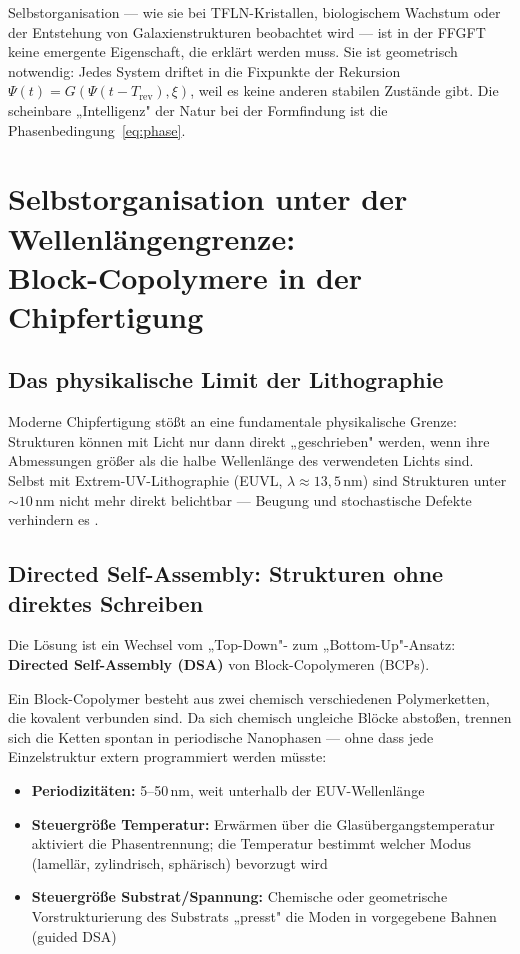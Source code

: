 Selbstorganisation — wie sie bei TFLN-Kristallen, biologischem Wachstum
oder der Entstehung von Galaxienstrukturen beobachtet wird — ist in der
FFGFT keine emergente Eigenschaft, die erklärt werden muss. Sie ist
geometrisch notwendig: Jedes System driftet in die Fixpunkte der
Rekursion $\Psi(t) = G(\Psi(t-T_\text{rev}), \xi)$, weil es keine
anderen stabilen Zustände gibt. Die scheinbare „Intelligenz" der Natur
bei der Formfindung ist die Phasenbedingung~\eqref{eq:phase}.

\section{Selbstorganisation unter der Wellenlängengrenze: \\
         Block-Copolymere in der Chipfertigung}

\subsection{Das physikalische Limit der Lithographie}

Moderne Chipfertigung stößt an eine fundamentale physikalische Grenze:
Strukturen können mit Licht nur dann direkt „geschrieben" werden, wenn
ihre Abmessungen größer als die halbe Wellenlänge des verwendeten Lichts sind.
Selbst mit Extrem-UV-Lithographie (EUVL, $\lambda \approx 13{,}5\,\text{nm}$)
sind Strukturen unter $\sim 10\,\text{nm}$ nicht mehr direkt belichtbar —
Beugung und stochastische Defekte verhindern es \cite{DSA2026,Lee2025}.

\subsection{Directed Self-Assembly: Strukturen ohne direktes Schreiben}

Die Lösung ist ein Wechsel vom „Top-Down"- zum „Bottom-Up"-Ansatz:
\textbf{Directed Self-Assembly (DSA)} von Block-Copolymeren (BCPs).

Ein Block-Copolymer besteht aus zwei chemisch verschiedenen Polymerketten,
die kovalent verbunden sind. Da sich chemisch ungleiche Blöcke abstoßen,
trennen sich die Ketten spontan in periodische Nanophasen — ohne dass
jede Einzelstruktur extern programmiert werden müsste:

\begin{itemize}
  \item \textbf{Periodizitäten:} 5--50\,nm, weit unterhalb der EUV-Wellenlänge
  \item \textbf{Steuergröße Temperatur:} Erwärmen über die Glasübergangstemperatur
    aktiviert die Phasentrennung; die Temperatur bestimmt welcher Modus
    (lamellär, zylindrisch, sphärisch) bevorzugt wird
  \item \textbf{Steuergröße Substrat/Spannung:} Chemische oder geometrische
    Vorstrukturierung des Substrats „presst" die Moden in vorgegebene Bahnen
    (guided DSA)
\end{itemize}

